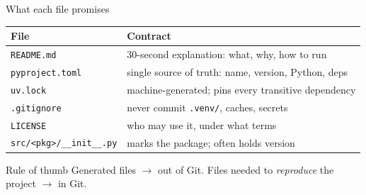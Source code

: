 \documentclass[aspectratio=169]{beamer}
\begin{document}
\begin{frame}{What each file promises}
  \begin{table}
    \small
    \begin{tabular}{@{}ll@{}}
      \toprule
      File & Contract \\
      \midrule
      \texttt{README.md} & 30-second explanation: what, why, how to run \\
      \texttt{pyproject.toml} & single source of truth: name, version, Python, deps \\
      \texttt{uv.lock} & machine-generated; pins every transitive dependency \\
      \texttt{.gitignore} & never commit \texttt{.venv/}, caches, secrets \\
      \texttt{LICENSE} & who may use it, under what terms \\
      \texttt{src/<pkg>/\_\_init\_\_.py} & marks the package; often holds version \\
      \bottomrule
    \end{tabular}
  \end{table}
  \vspace{0.3cm}
  \begin{block}{Rule of thumb}
    Generated files $\rightarrow$ out of Git. Files needed to \emph{reproduce}
    the project $\rightarrow$ in Git.
  \end{block}
\end{frame}
\end{document}
